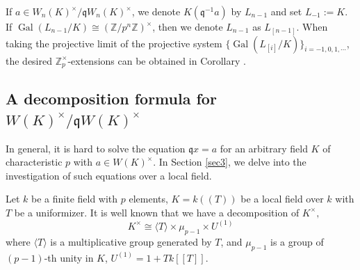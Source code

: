 \documentclass{proc-l}
\theoremstyle{definition}
\theoremstyle{remark}
\numberwithin{equation}{section}
\DeclareMathOperator{\Gal}{Gal}
\begin{document}
{If $a\in W_{n}(K)^\times/\mathfrak qW_{n}(K)^\times$, we denote $K(\mathfrak q^{-1}a)$ by $L_{n-1}$ and set $L_{-1}:=K$. If $\Gal(L_{n-1}/K)\cong(\mathbb Z/p^{n}\mathbb Z)^\times$, then we denote $L_{n-1}$ as $L_{[n-1]}$. When taking the projective limit of the projective system $\{\Gal(L_{[i]}/K)\}_{i=-1,0,1,\cdots}$,  the desired $\mathbb Z_p^\times$-extensions can be obtained in Corollary \boxed {\ref {cor14}}.




\subsection{A decomposition formula for 
$W(K)^\times/\mathfrak qW(K)^\times$}
In general, it is hard to solve the equation $\mathfrak qx=a$ for an arbitrary field $K$ of characteristic $p$ with $a\in W(K)^\times$. In Section \ref{sec3}, we delve into the investigation of such equations over a local field.

Let $k$ be a finite field with $p$ elements, $K=k((T))$ be a local field over $k$ with $T$ be a uniformizer. It is well known \cite[Chapter II, Proposition 5.3]{MR1697859} that we have a decomposition of $K^\times,$ 
    $$K^\times\cong \langle T\rangle\times\mu_{p-1}\times U^{(1)}$$
where $\langle T\rangle$ is a multiplicative group generated by  $T$,  and $\mu_{p-1}$ is a group of $(p-1)$-th unity in $K$, $U^{(1)}=1+Tk[\![T]\!]$.


}
\end{document}
